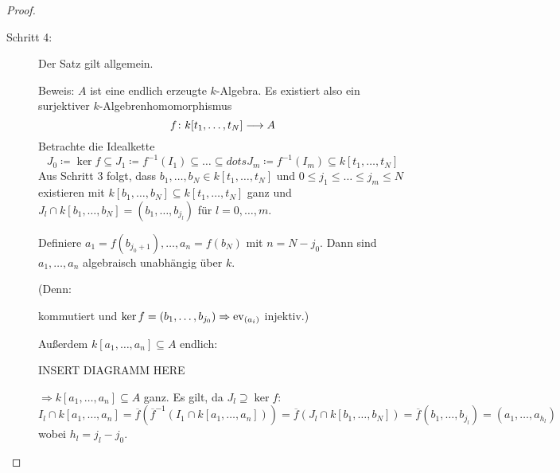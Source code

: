 \documentclass[12pt,a4paper]{scrartcl}
\theoremstyle{cplain}
\theoremstyle{cdef}
\begin{document}
\begin{proof}
\begin{description}
		\item[Schritt 4:] Der Satz gilt allgemein.
		
		Beweis: $A$ ist eine endlich erzeugte $k$-Algebra. Es existiert also ein surjektiver $k$-Algebrenhomomorphismus
		$$f\colon k[t_1,\dots, t_N]\longrightarrow A$$
		Betrachte die Idealkette 
		$$J_0\coloneqq \ker f\subseteq J_1\coloneqq f^{-1}(I_1)\subseteq\dots \subseteq dots J_m\coloneqq f^{-1}(I_m)\subseteq k[t_1,\dots, t_N]$$
		Aus Schritt 3 folgt, dass $b_1,\dots, b_N\in k[t_1,\dots, t_N]$ und $0\leq j_1\leq\dots\leq j_m\leq N$ existieren mit $k[b_1,\dots, b_N]\subseteq k[t_1,\dots, t_N]$ ganz und $J_l\cap k[b_1,\dots, b_N] = (b_1,\dots, b_{j_l})$ für $l = 0,\dots, m$.
		
		Definiere $a_1 = f(b_{j_0+1}),\dots, a_n = f(b_{N})$ mit $n = N-j_0$. Dann sind $a_1,\dots, a_n$ algebraisch unabhängig über $k$.
		
		(Denn: \begin{center}
		\end{center}
		kommutiert und $\operatorname{ker} f = (b_1,\dots, b_{j_0}) \Rightarrow \operatorname{ev}_{(a_i)}$ injektiv.)
		
		Außerdem $k[a_1,\dots, a_n]\subseteq A$ endlich:
		
		INSERT DIAGRAMM HERE
		
		$\Rightarrow k[a_1,\dots, a_n]\subseteq A$ ganz. Es gilt, da $J_l\supseteq \ker f$:
		$$I_l\cap k[a_1,\dots, a_n] = \overline{f}(\overline{f}^{-1}(I_1\cap k[a_1,\dots, a_n])) = \overline{f}(J_l\cap k[b_1,\dots, b_N]) = \overline{f}(b_1,\dots, b_{j_l}) = (a_1,\dots, a_{h_l})$$
		wobei $h_l = j_l-j_0$.
		

\end{description}
\end{proof}
\end{document}
